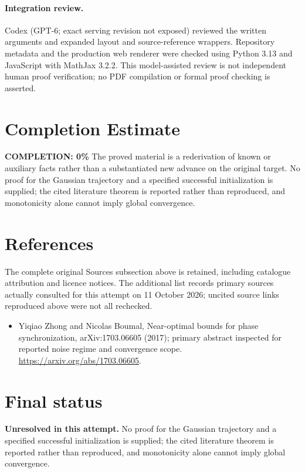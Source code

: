 \documentclass[11pt]{article}
\begin{document}
\paragraph{Integration review.} Codex (GPT-6; exact serving revision not exposed) reviewed the written arguments and expanded layout and source-reference wrappers. Repository metadata and the production web renderer were checked using Python 3.13 and JavaScript with MathJax 3.2.2. This model-assisted review is not independent human proof verification; no PDF compilation or formal proof checking is asserted.

\section{Completion Estimate}
\noindent\textbf{COMPLETION: 0\%}
The proved material is a rederivation of known or auxiliary facts rather than a substantiated new advance on the original target. No proof for the Gaussian trajectory and a specified successful initialization is supplied; the cited literature theorem is reported rather than reproduced, and monotonicity alone cannot imply global convergence.
\section{References}
The complete original Sources subsection above is retained, including catalogue attribution and licence notices. The additional list records primary sources actually consulted for this attempt on 11 October 2026; uncited source links reproduced above were not all rechecked.
\begin{itemize}
\item Yiqiao Zhong and Nicolas Boumal, Near-optimal bounds for phase synchronization, arXiv:1703.06605 (2017); primary abstract inspected for reported noise regime and convergence scope. \url{https://arxiv.org/abs/1703.06605}.
\end{itemize}
\section{Final status}
\textbf{Unresolved in this attempt.} No proof for the Gaussian trajectory and a specified successful initialization is supplied; the cited literature theorem is reported rather than reproduced, and monotonicity alone cannot imply global convergence.
\end{document}
